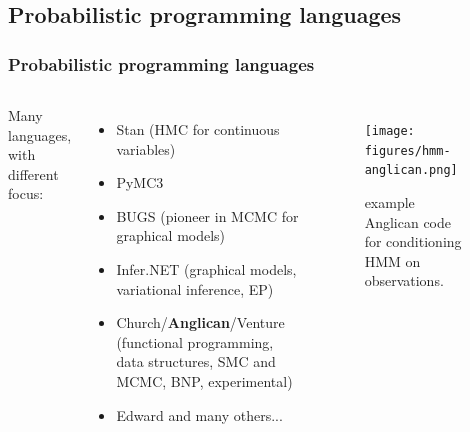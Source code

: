 \documentclass[aspectratio=169]{beamer}
\begin{document}
\begin{frame}
    \subsection{Probabilistic programming languages}

    \frametitle{Probabilistic programming languages}
    \begin{columns}[c] %

        Many languages, with different focus:
        \begin{itemize}
            \item Stan (HMC for continuous variables)
            \item PyMC3 
            \item BUGS (pioneer in MCMC for graphical models)
            \item Infer.NET (graphical models, variational inference, EP)
            \item Church/{\bf Anglican}/Venture (functional programming, data structures, SMC and MCMC, BNP, experimental)
            \item Edward and many others...
        \end{itemize}

        \begin{figure}[ht!]
            \texttt{[image: figures/hmm-anglican.png]}
            \caption{example Anglican code for conditioning HMM on observations.}
        \end{figure}
    \end{columns}
\end{frame}



\end{document}
